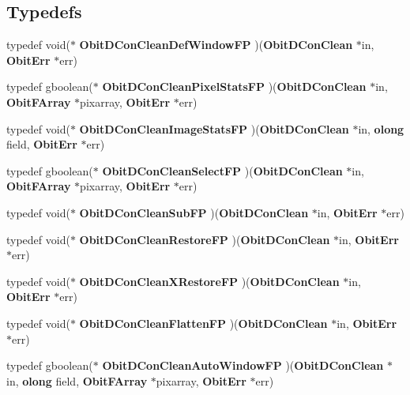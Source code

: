 \subsection*{Typedefs}
\begin{CompactItemize}
\item 
typedef void($\ast$ {\bf Obit\-DCon\-Clean\-Def\-Window\-FP} )({\bf Obit\-DCon\-Clean} $\ast$in, {\bf Obit\-Err} $\ast$err)
\item 
typedef gboolean($\ast$ {\bf Obit\-DCon\-Clean\-Pixel\-Stats\-FP} )({\bf Obit\-DCon\-Clean} $\ast$in, {\bf Obit\-FArray} $\ast$pixarray, {\bf Obit\-Err} $\ast$err)
\item 
typedef void($\ast$ {\bf Obit\-DCon\-Clean\-Image\-Stats\-FP} )({\bf Obit\-DCon\-Clean} $\ast$in, {\bf olong} field, {\bf Obit\-Err} $\ast$err)
\item 
typedef gboolean($\ast$ {\bf Obit\-DCon\-Clean\-Select\-FP} )({\bf Obit\-DCon\-Clean} $\ast$in, {\bf Obit\-FArray} $\ast$pixarray, {\bf Obit\-Err} $\ast$err)
\item 
typedef void($\ast$ {\bf Obit\-DCon\-Clean\-Sub\-FP} )({\bf Obit\-DCon\-Clean} $\ast$in, {\bf Obit\-Err} $\ast$err)
\item 
typedef void($\ast$ {\bf Obit\-DCon\-Clean\-Restore\-FP} )({\bf Obit\-DCon\-Clean} $\ast$in, {\bf Obit\-Err} $\ast$err)
\item 
typedef void($\ast$ {\bf Obit\-DCon\-Clean\-XRestore\-FP} )({\bf Obit\-DCon\-Clean} $\ast$in, {\bf Obit\-Err} $\ast$err)
\item 
typedef void($\ast$ {\bf Obit\-DCon\-Clean\-Flatten\-FP} )({\bf Obit\-DCon\-Clean} $\ast$in, {\bf Obit\-Err} $\ast$err)
\item 
typedef gboolean($\ast$ {\bf Obit\-DCon\-Clean\-Auto\-Window\-FP} )({\bf Obit\-DCon\-Clean} $\ast$in, {\bf olong} field, {\bf Obit\-FArray} $\ast$pixarray, {\bf Obit\-Err} $\ast$err)
\end{CompactItemize}
